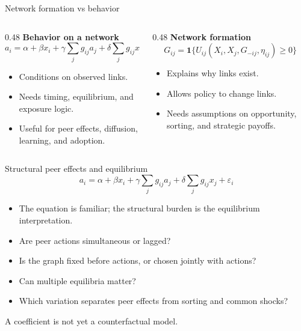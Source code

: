 \documentclass[aspectratio=169,11pt]{beamer}
\newcommand{\1}{\mathbf{1}}
\begin{document}
\begin{frame}{Network formation vs behavior}
\small
\begin{columns}[T,onlytextwidth]
\begin{column}{0.48\linewidth}
\textbf{Behavior on a network}
\[
a_i
=
\alpha+\beta x_i
+\gamma\sum_j g_{ij}a_j
+\delta\sum_j g_{ij}x_j+\varepsilon_i
\]
\begin{itemize}
    \item Conditions on observed links.
    \item Needs timing, equilibrium, and exposure logic.
    \item Useful for peer effects, diffusion, learning, and adoption.
\end{itemize}
\end{column}
\begin{column}{0.48\linewidth}
\textbf{Network formation}
\[
G_{ij}
=
\1\{U_{ij}(X_i,X_j,G_{-ij},\eta_{ij})\ge 0\}
\]
\begin{itemize}
    \item Explains why links exist.
    \item Allows policy to change links.
    \item Needs assumptions on opportunity, sorting, and strategic payoffs.
\end{itemize}
\end{column}
\end{columns}
\end{frame}

\begin{frame}{Structural peer effects and equilibrium}
\small
\[
a_i
=
\alpha
+ \beta x_i
+ \gamma \sum_j g_{ij}a_j
+ \delta \sum_j g_{ij}x_j
+ \varepsilon_i
\]

\begin{itemize}
    \item The equation is familiar; the structural burden is the equilibrium interpretation.
    \item Are peer actions simultaneous or lagged?
    \item Is the graph fixed before actions, or chosen jointly with actions?
    \item Can multiple equilibria matter?
    \item Which variation separates peer effects from sorting and common shocks?
\end{itemize}

\medskip
A coefficient is not yet a counterfactual model.
\end{frame}
\end{document}
